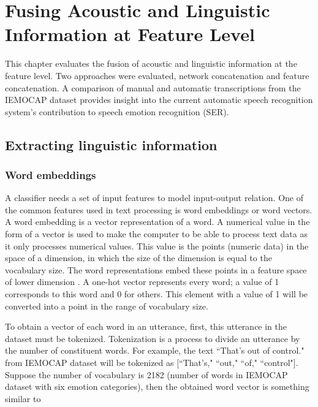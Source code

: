 \chapter{Fusing Acoustic and Linguistic Information at Feature Level}
This chapter evaluates the fusion of acoustic and linguistic information at the
feature level. Two approaches were evaluated, network concatenation and feature
concatenation. A comparison of manual and automatic transcriptions from the
IEMOCAP dataset provides insight into the current automatic speech recognition
system's contribution to speech emotion recognition (SER).

\section{Extracting linguistic information}

\subsection{Word embeddings}
A classifier needs a set of input features to model input-output relation. One
of the common features used in text processing is word embeddings or word
vectors. A word embedding is a vector representation of a word. A numerical
value in the form of a vector is used to make the computer to be able to
process text data as it only processes numerical values. This value is the
points (numeric data) in the space of a dimension, in which the size of the
dimension is equal to the vocabulary size.  The word representations embed
these points in a feature space of lower dimension
\cite{IanGoodfellowYoshuaBengio2015}. A one-hot vector represents every word; a
value of 1 corresponds to this word and 0 for others.  This element with a
value of 1 will be converted into a point in the range of vocabulary size.

To obtain a vector of each word in an utterance, first, this utterance in the
dataset must be tokenized. Tokenization is a process to divide an utterance by
the number of constituent words. For example, the text ``That's out of control."
from IEMOCAP dataset will be tokenized as [``That's," ``out," ``of,"
``control"].  Suppose the number of vocabulary is 2182 (number of words in
IEMOCAP dataset with six emotion categories), then the obtained word vector is
something similar to

